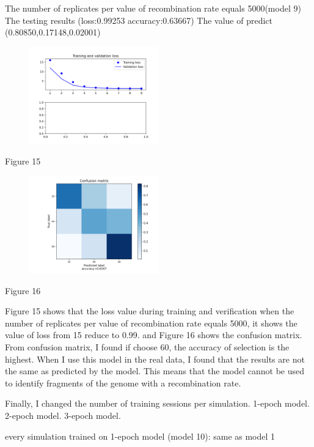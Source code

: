 \documentclass[11pt,a4 paper,title page]{article}
\begin{document}
The number of replicates per value of recombination rate equals 5000(model 9)
\hfill\break 
The testing results (loss:0.99253 accuracy:0.63667)
\hfill\break 
The value of predict (0.80850,0.17148,0.02001)
\begin{figure}[H]
\centering
\includegraphics[width=0.5\textwidth,angle=360]{../picture/figure15.png}
\end{figure}
\centerline{Figure 15}
\hfill\break 
\begin{figure}[H]
\centering
\includegraphics[width=0.5\textwidth,angle=360]{../picture/figure16.png}
\end{figure}
\centerline{Figure 16}
\hfill\break
Figure 15 shows that the loss value during training and verification when the number of replicates per value of recombination rate equals 5000, it shows the value of loss from 15 reduce to 0.99. and Figure 16 shows the confusion matrix. From confusion matrix, I found if choose 60, the accuracy of selection is the highest. When I use this model in the real data, I found that the results are not the same as predicted by the model. This means that the model cannot be used to identify fragments of the genome with a recombination rate.
\hfill\break

Finally, I changed the number of training sessions per simulation. 1-epoch model. 2-epoch model. 3-epoch model.
\hfill\break

every simulation trained on 1-epoch model (model 10):
\hfill\break 
same as model 1
\hfill\break
\end{document}

